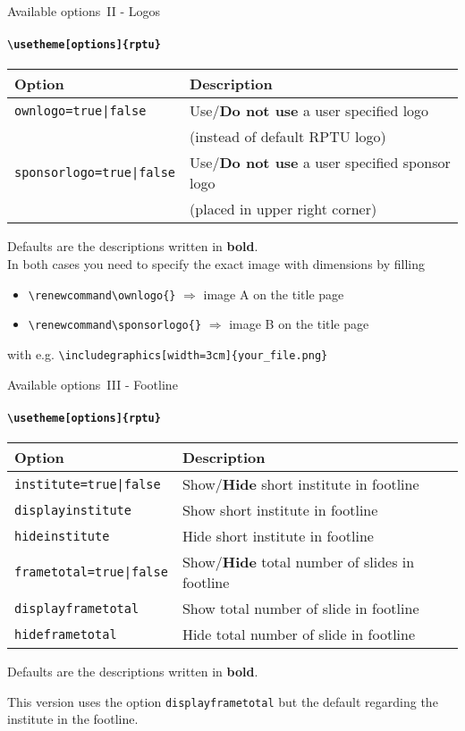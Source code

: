 \begin{frame}{Available options~II - Logos}
	\framesubtitle{\texttt{\textbackslash usetheme[options]\{rptu\}}}
	\begin{tabular}{ll}
		\textbf{Option} & \textbf{Description}\\ \toprule
		\texttt{ownlogo=true|false} & Use/\textbf{Do not use} a user specified logo \\ 
		& (instead of default RPTU logo) \\
		\texttt{sponsorlogo=true|false} & Use/\textbf{Do not use} a user specified sponsor logo \\ & (placed in upper right corner) \\\bottomrule
	\end{tabular}
	\vspace*{2ex}
	
	Defaults are the descriptions written in \textbf{bold}.\\ In both cases you need to specify the exact image with dimensions by filling 
	\begin{itemize}
		\item \texttt{\textbackslash renewcommand{\textbackslash ownlogo}\{\}} \hspace{1em}$\Rightarrow$\hspace{1em} image A on the title page
		\item \texttt{\textbackslash renewcommand{\textbackslash sponsorlogo}\{\}}  \hspace{1em}$\Rightarrow$\hspace{1em} image B on the title page
	\end{itemize}
	with e.g. \texttt{\textbackslash includegraphics[width=3cm]\{your\_file.png\}}
\end{frame}

\begin{frame}{Available options~III - Footline}
	\framesubtitle{\texttt{\textbackslash usetheme[options]\{rptu\}}}
	\begin{tabular}{ll}
		\textbf{Option} & \textbf{Description}\\ \toprule
		\texttt{institute=true|false} &Show/\textbf{Hide} short institute in footline \\
		\texttt{displayinstitute} & Show short institute in footline \\ 
		\texttt{hideinstitute} & Hide short institute in footline \\ \midrule
		\texttt{frametotal=true|false} &Show/\textbf{Hide} total number of slides in footline\\
		\texttt{displayframetotal} & Show total number of slide in footline\\ 
		\texttt{hideframetotal} & Hide total number of slide in footline\\  \bottomrule
	\end{tabular}
	\vspace*{2ex}
	
	Defaults are the descriptions written in \textbf{bold}.
	
	This version uses the option \texttt{displayframetotal} but the default regarding the institute in the footline. \end{frame}

